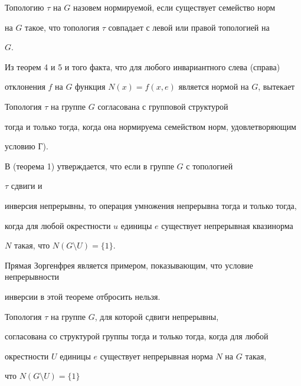 Топологию $\tau$ на $G$ назовем нормируемой, если существует семейство норм 


на $G$ такое, что топология $\tau$ совпадает с левой или правой топологией на 


$G$. 


 


Из теорем 4 и 5 и того факта, что для любого инвариантного слева (справа) 


отклонения $f$ на $G$ функция $N(x)=f(x,e)$ является нормой на $G$, вытекает 


 


\begin{thm} Топология $\tau$ на группе $G$ согласована с групповой структурой 


тогда и только тогда, когда она нормируема семейством норм, удовлетворяющим 


условию Г). 


\end{thm} 


 


В \cite{Bul} (теорема 1) утверждается, что если в группе $G$ с топологией 


$\tau$ сдвиги и 


инверсия непрерывны, то операция умножения непрерывна тогда и только тогда, 


когда для любой окрестности $u$ единицы $e$ существует непрерывная квазинорма 


$N$ такая, что $N(G\setminus U)=\{1\}$. 


 


Прямая Зоргенфрея является примером, показывающим, что условие непрерывности 


инверсии в этой теореме отбросить нельзя. 


 


\begin{thm} Топология $\tau$ на группе $G$, для которой сдвиги непрерывны, 


согласована со структурой группы тогда и только тогда, когда для любой 


окрестности $U$ единицы $e$ существует непрерывная норма $N$ на $G$ такая, 


что $N(G\setminus U)=\{1\}$ 


\end{thm} 


